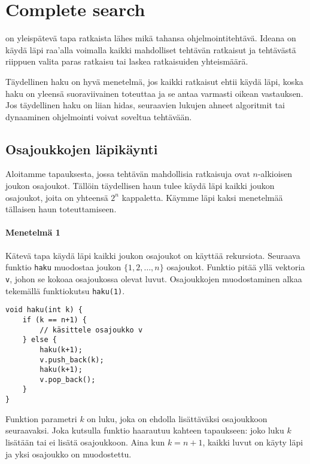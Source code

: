 \chapter{Complete search}

on yleispätevä tapa ratkaista
lähes mikä tahansa ohjelmointitehtävä.
Ideana on käydä läpi raa'alla voimalla kaikki
mahdolliset tehtävän ratkaisut ja tehtävästä riippuen
valita paras ratkaisu
tai laskea ratkaisuiden yhteismäärä.
          
Täydellinen haku on hyvä menetelmä, jos kaikki
ratkaisut ehtii käydä läpi,
koska haku on yleensä suoraviivainen toteuttaa
ja se antaa varmasti oikean vastauksen.
Jos täydellinen haku on liian hidas,
seuraavien lukujen ahneet algoritmit tai
dynaaminen ohjelmointi voivat soveltua
tehtävään.

\section{Osajoukkojen läpikäynti}


Aloitamme tapauksesta, jossa tehtävän
mahdollisia ratkaisuja ovat
$n$-alkioisen joukon osajoukot.
Tällöin täydellisen haun tulee
käydä läpi kaikki joukon osa\-joukot,
joita on yhteensä $2^n$ kappaletta.
Käymme läpi kaksi menetelmää
tällaisen haun toteuttamiseen.

\subsubsection{Menetelmä 1}

Kätevä tapa käydä läpi
kaikki joukon osajoukot on
käyttää rekursiota.
Seuraava funktio \texttt{haku} muodostaa
joukon $\{1,2,\ldots,n\}$ osajoukot.
Funktio pitää yllä vektoria \texttt{v},
johon se kokoaa osajoukossa olevat luvut.
Osajoukkojen muodostaminen alkaa
tekemällä funktiokutsu \texttt{haku(1)}.

\begin{lstlisting}
void haku(int k) {
    if (k == n+1) {
        // käsittele osajoukko v
    } else {
        haku(k+1);
        v.push_back(k);
        haku(k+1);
        v.pop_back();
    }
}
\end{lstlisting}

Funktion parametri $k$ on luku,
joka on ehdolla lisättäväksi osajoukkoon seuraavaksi.
Joka kutsulla funktio haarautuu kahteen tapaukseen:
joko luku $k$ lisätään tai ei lisätä osajoukkoon.
Aina kun $k=n+1$, kaikki luvut on käyty läpi
ja yksi osajoukko on muodostettu.

